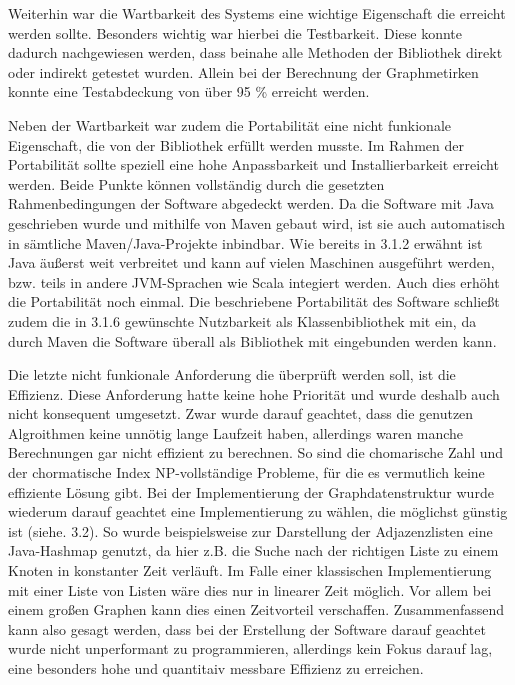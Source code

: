 \documentclass[a4paper,12pt,ngerman,chapterprefix=false,listof=totoc,bibliography=totoc]{scrreprt}
\begin{document}
{{{Weiterhin war die Wartbarkeit des Systems eine wichtige Eigenschaft die erreicht werden sollte. Besonders wichtig war hierbei die Testbarkeit. Diese konnte dadurch nachgewiesen werden, dass beinahe alle Methoden der Bibliothek direkt oder indirekt getestet wurden. Allein bei der Berechnung der Graphmetirken konnte eine Testabdeckung von über 95 \% erreicht werden.

Neben der Wartbarkeit war zudem die Portabilität eine nicht funkionale Eigenschaft, die von der Bibliothek erfüllt werden musste. Im Rahmen der Portabilität sollte speziell eine hohe Anpassbarkeit und Installierbarkeit erreicht werden. Beide Punkte können vollständig durch die gesetzten Rahmenbedingungen der Software abgedeckt werden. Da die Software mit Java geschrieben wurde und mithilfe von Maven gebaut wird, ist sie auch automatisch in sämtliche Maven/Java-Projekte inbindbar. Wie bereits in 3.1.2 erwähnt ist Java äußerst weit verbreitet und kann auf vielen Maschinen ausgeführt werden, bzw. teils in andere JVM-Sprachen wie Scala integiert werden. \cite{ullenboom_java_2016} Auch dies erhöht die Portabilität noch einmal. Die beschriebene Portabilität des Software schließt zudem die in 3.1.6 gewünschte Nutzbarkeit als Klassenbibliothek mit ein, da durch Maven die Software überall als Bibliothek mit eingebunden werden kann.

Die letzte nicht funkionale Anforderung die überprüft werden soll, ist die Effizienz. Diese Anforderung hatte keine hohe Priorität und wurde deshalb auch nicht konsequent umgesetzt. Zwar wurde darauf geachtet, dass die genutzen Algroithmen keine unnötig lange Laufzeit haben, allerdings waren manche Berechnungen gar nicht effizient zu berechnen. So sind die chomarische Zahl und der chormatische Index NP-vollständige Probleme, für die es vermutlich keine effiziente Lösung gibt. Bei der Implementierung der Graphdatenstruktur wurde wiederum darauf geachtet eine Implementierung zu wählen, die möglichst günstig ist (siehe. 3.2). So wurde beispielsweise zur Darstellung der Adjazenzlisten eine Java-Hashmap genutzt, da hier z.B. die Suche nach der richtigen Liste zu einem Knoten in konstanter Zeit verläuft. Im Falle einer klassischen Implementierung mit einer Liste von Listen wäre dies nur in linearer Zeit möglich. Vor allem bei einem großen Graphen kann dies einen Zeitvorteil verschaffen. Zusammenfassend kann also gesagt werden, dass bei der Erstellung der Software darauf geachtet wurde nicht unperformant zu programmieren, allerdings kein Fokus darauf lag, eine besonders hohe und quantitaiv messbare Effizienz zu erreichen.
}
}}
\end{document}
